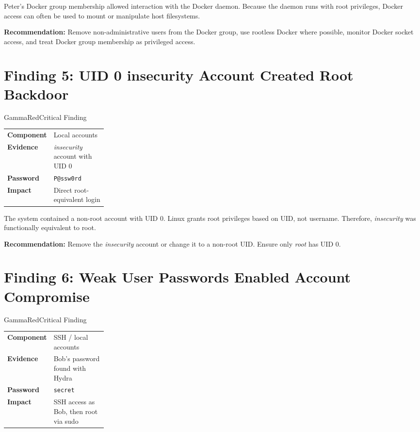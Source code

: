 \documentclass[11pt,a4paper]{report}
\newif\ifredact
\newcommand{\secret}[1]{\ifredact\texttt{[REDACTED]}\else\texttt{#1}\fi}
\begin{document}
Peter's Docker group membership allowed interaction with the Docker daemon. Because the daemon runs with root privileges, Docker access can often be used to mount or manipulate host filesystems.

\textbf{Recommendation:} Remove non-administrative users from the Docker group, use rootless Docker where possible, monitor Docker socket access, and treat Docker group membership as privileged access.

\section{Finding 5: UID 0 insecurity Account Created Root Backdoor}
\begin{findingbox}{GammaRed}{Critical Finding}
\begin{tabularx}{\linewidth}{L{0.24\linewidth} Y}
\textbf{Component} & Local accounts \\
\textbf{Evidence} & \textit{insecurity} account with UID 0 \\
\textbf{Password} & \secret{P@ssw0rd} \\
\textbf{Impact} & Direct root-equivalent login \\
\end{tabularx}
\end{findingbox}

The system contained a non-root account with UID 0. Linux grants root privileges based on UID, not username. Therefore, \textit{insecurity} was functionally equivalent to root.

\textbf{Recommendation:} Remove the \textit{insecurity} account or change it to a non-root UID. Ensure only \textit{root} has UID 0.

\section{Finding 6: Weak User Passwords Enabled Account Compromise}
\begin{findingbox}{GammaRed}{Critical Finding}
\begin{tabularx}{\linewidth}{L{0.24\linewidth} Y}
\textbf{Component} & SSH / local accounts \\
\textbf{Evidence} & Bob's password found with Hydra \\
\textbf{Password} & \secret{secret} \\
\textbf{Impact} & SSH access as Bob, then root via sudo \\
\end{tabularx}
\end{findingbox}
\end{document}
